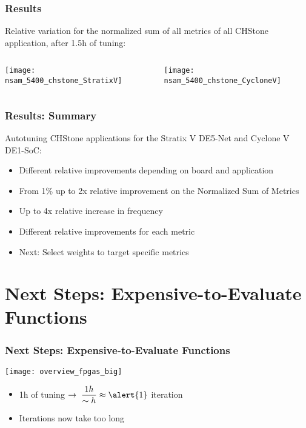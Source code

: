 \documentclass[10pt, compress, aspectratio=169]{beamer}
\begin{document}
\begin{frame}
    \frametitle{Results}
    Relative variation for the \alert{normalized sum of all metrics}
    of all CHStone application, after \alert{1.5h of tuning}:
    \begin{columns}[T,onlytextwidth]
        \begin{center}
            \texttt{[image: nsam\_5400\_chstone\_StratixV]}
        \end{center}

        \begin{center}
            \texttt{[image: nsam\_5400\_chstone\_CycloneV]}
        \end{center}

    \end{columns}
\end{frame}

\begin{frame}
    \frametitle{Results: Summary}
    Autotuning CHStone applications for the \alert{Stratix V DE5-Net} and
    \alert{Cyclone V DE1-SoC}:
    \begin{itemize}
        \item \alert{Different relative improvements} depending on \alert{board and application}
        \item From \alert{1\% up to 2x relative improvement} on the \alert{Normalized Sum of Metrics}
        \item Up to \alert{4x relative increase in frequency}
        \item Different relative improvements \alert{for each metric}
        \item Next: \alert{Select weights to target specific metrics}
    \end{itemize}
\end{frame}

\section{Next Steps: Expensive-to-Evaluate Functions}

\begin{frame}
    \frametitle{Next Steps: Expensive-to-Evaluate Functions}
    \begin{center}
        \texttt{[image: overview\_fpgas\_big]}
    \end{center}

    \begin{itemize}
        \item \alert{1h} of tuning $\rightarrow \; \dfrac{1h}{\sim{}h} \approx \alert{1}$ \alert{iteration}
        \item Iterations now \alert{take too long}
    \end{itemize}
\end{frame}
\end{document}

